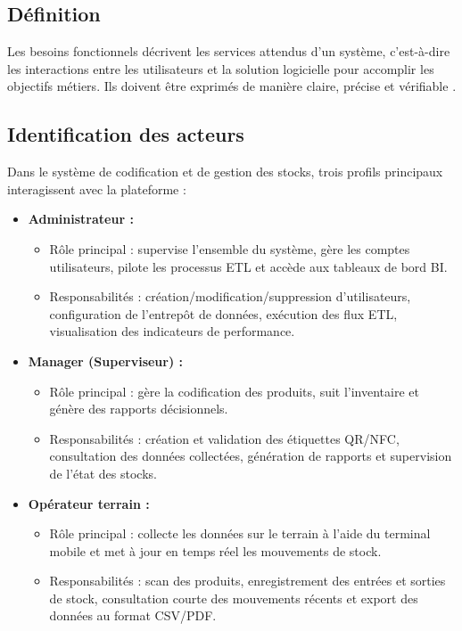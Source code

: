 \documentclass[12pt,a4paper]{report}
\begin{document}
\subsection{Définition}
Les besoins fonctionnels décrivent les services attendus d’un système, c’est-à-dire les interactions entre les utilisateurs et la solution logicielle pour accomplir les objectifs métiers. Ils doivent être exprimés de manière claire, précise et vérifiable \cite{Sommerville2011}.

\subsection{Identification des acteurs}
Dans le système de codification et de gestion des stocks, trois profils principaux interagissent avec la plateforme :
\begin{itemize}
  \item \textbf{Administrateur :}  
    \begin{itemize}
      \item Rôle principal : supervise l’ensemble du système, gère les comptes utilisateurs, pilote les processus ETL et accède aux tableaux de bord BI.  
      \item Responsabilités : création/modification/suppression d’utilisateurs, configuration de l’entrepôt de données, exécution des flux ETL, visualisation des indicateurs de performance.
    \end{itemize}
  \item \textbf{Manager (Superviseur) :}  
    \begin{itemize}
      \item Rôle principal : gère la codification des produits, suit l’inventaire et génère des rapports décisionnels.  
      \item Responsabilités : création et validation des étiquettes QR/NFC, consultation des données collectées, génération de rapports et supervision de l’état des stocks.
    \end{itemize}
  \item \textbf{Opérateur terrain :}  
    \begin{itemize}
      \item Rôle principal : collecte les données sur le terrain à l’aide du terminal mobile et met à jour en temps réel les mouvements de stock.  
      \item Responsabilités : scan des produits, enregistrement des entrées et sorties de stock, consultation courte des mouvements récents et export des données au format CSV/PDF.
    \end{itemize}
\end{itemize}
\end{document}
